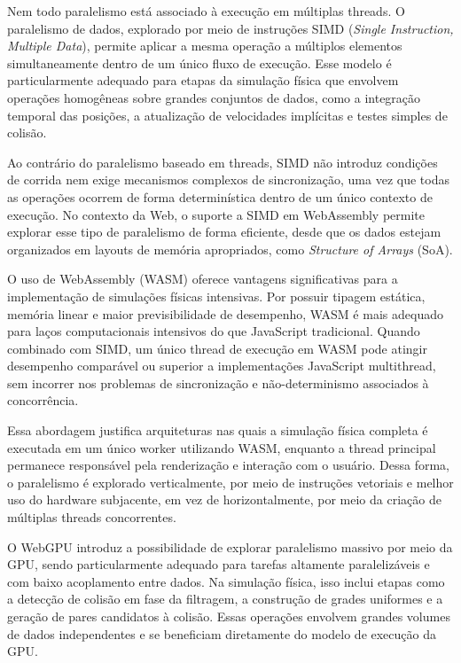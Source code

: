 Nem todo paralelismo está associado à execução em múltiplas threads. O paralelismo de dados, explorado por meio de instruções SIMD (\textit{Single Instruction, Multiple Data}), permite aplicar a mesma operação a múltiplos elementos simultaneamente dentro de um único fluxo de execução. Esse modelo é particularmente adequado para etapas da simulação física que envolvem operações homogêneas sobre grandes conjuntos de dados, como a integração temporal das posições, a atualização de velocidades implícitas e testes simples de colisão.

Ao contrário do paralelismo baseado em threads, SIMD não introduz condições de corrida nem exige mecanismos complexos de sincronização, uma vez que todas as operações ocorrem de forma determinística dentro de um único contexto de execução. No contexto da Web, o suporte a SIMD em WebAssembly permite explorar esse tipo de paralelismo de forma eficiente, desde que os dados estejam organizados em layouts de memória apropriados, como \textit{Structure of Arrays} (SoA).

O uso de WebAssembly (WASM) oferece vantagens significativas para a implementação de simulações físicas intensivas. Por possuir tipagem estática, memória linear e maior previsibilidade de desempenho, WASM é mais adequado para laços computacionais intensivos do que JavaScript tradicional. Quando combinado com SIMD, um único thread de execução em WASM pode atingir desempenho comparável ou superior a implementações JavaScript multithread, sem incorrer nos problemas de sincronização e não-determinismo associados à concorrência.

Essa abordagem justifica arquiteturas nas quais a simulação física completa é executada em um único worker utilizando WASM, enquanto a thread principal permanece responsável pela renderização e interação com o usuário. Dessa forma, o paralelismo é explorado verticalmente, por meio de instruções vetoriais e melhor uso do hardware subjacente, em vez de horizontalmente, por meio da criação de múltiplas threads concorrentes.

O WebGPU introduz a possibilidade de explorar paralelismo massivo por meio da GPU, sendo particularmente adequado para tarefas altamente paralelizáveis e com baixo acoplamento entre dados. Na simulação física, isso inclui etapas como a detecção de colisão em fase da filtragem, a construção de grades uniformes e a geração de pares candidatos à colisão. Essas operações envolvem grandes volumes de dados independentes e se beneficiam diretamente do modelo de execução da GPU.

